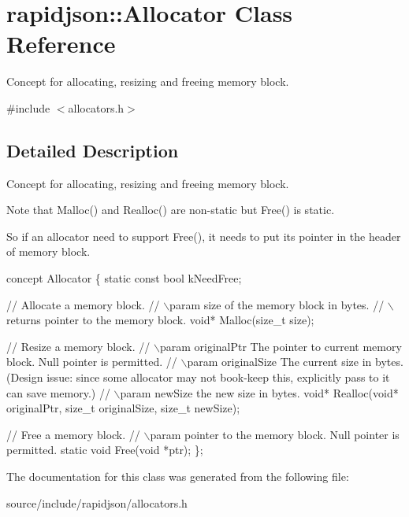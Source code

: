 \hypertarget{classrapidjson_1_1_allocator}{}\section{rapidjson\+:\+:Allocator Class Reference}
\label{classrapidjson_1_1_allocator}


Concept for allocating, resizing and freeing memory block.  




{\ttfamily \#include $<$allocators.\+h$>$}



\subsection{Detailed Description}
Concept for allocating, resizing and freeing memory block. 

Note that Malloc() and Realloc() are non-\/static but Free() is static.

So if an allocator need to support Free(), it needs to put its pointer in the header of memory block.


\begin{DoxyCode}
concept Allocator \{
    \textcolor{keyword}{static} \textcolor{keyword}{const} \textcolor{keywordtype}{bool} kNeedFree;    

    \textcolor{comment}{// Allocate a memory block.}
    \textcolor{comment}{// \(\backslash\)param size of the memory block in bytes.}
    \textcolor{comment}{// \(\backslash\)returns pointer to the memory block.}
    \textcolor{keywordtype}{void}* Malloc(\textcolor{keywordtype}{size\_t} size);

    \textcolor{comment}{// Resize a memory block.}
    \textcolor{comment}{// \(\backslash\)param originalPtr The pointer to current memory block. Null pointer is permitted.}
    \textcolor{comment}{// \(\backslash\)param originalSize The current size in bytes. (Design issue: since some allocator may not book-keep
       this, explicitly pass to it can save memory.)}
    \textcolor{comment}{// \(\backslash\)param newSize the new size in bytes.}
    \textcolor{keywordtype}{void}* Realloc(\textcolor{keywordtype}{void}* originalPtr, \textcolor{keywordtype}{size\_t} originalSize, \textcolor{keywordtype}{size\_t} newSize);

    \textcolor{comment}{// Free a memory block.}
    \textcolor{comment}{// \(\backslash\)param pointer to the memory block. Null pointer is permitted.}
    \textcolor{keyword}{static} \textcolor{keywordtype}{void} Free(\textcolor{keywordtype}{void} *ptr);
\};
\end{DoxyCode}
 

The documentation for this class was generated from the following file\+:\begin{DoxyCompactItemize}
\item 
source/include/rapidjson/allocators.\+h\end{DoxyCompactItemize}

